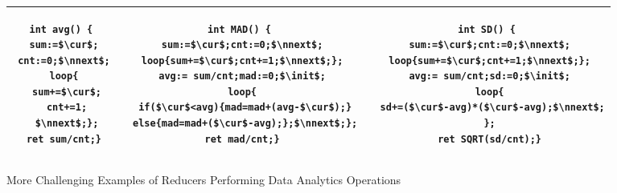 \vspace{-0.7cm}
\begin{figure}
	\centering
	\lstset{language=C,
		basicstyle=\ttfamily\scriptsize}
	\begin{tabular}{|c|c|c|}
		\hline
		\begin{minipage}[t]{0.2\textwidth}
		\vspace{-0.5cm}
			\begin{lstlisting}[mathescape=true]
int avg() {
 sum:=$\cur$;
 cnt:=0;$\nnext$;
 loop{
  sum+=$\cur$;
  cnt+=1;
  $\nnext$;};
 ret sum/cnt;}
			\end{lstlisting}
		\end{minipage}&
		\begin{minipage}[t]{0.4\textwidth}
		\vspace{-0.5cm}
\begin{lstlisting}[mathescape=true]
int MAD() {
 sum:=$\cur$;cnt:=0;$\nnext$;
 loop{sum+=$\cur$;cnt+=1;$\nnext$;};
 avg:= sum/cnt;mad:=0;$\init$;
 loop{
  if($\cur$<avg){mad=mad+(avg-$\cur$);}
  else{mad=mad+($\cur$-avg);};$\nnext$;};
 ret mad/cnt;}
\end{lstlisting}
		\end{minipage}&
		\begin{minipage}[t]{0.4\textwidth}
		\vspace{-0.5cm}
			\begin{lstlisting}[mathescape=true]
int SD() {
 sum:=$\cur$;cnt:=0;$\nnext$;
 loop{sum+=$\cur$;cnt+=1;$\nnext$;};
 avg:= sum/cnt;sd:=0;$\init$;
 loop{
  sd+=($\cur$-avg)*($\cur$-avg);$\nnext$;
 };
 ret SQRT(sd/cnt);}
			\end{lstlisting}
		\end{minipage}\\
		\hline		
	\end{tabular}
	\caption{More Challenging Examples of Reducers Performing Data Analytics Operations}
	\label{fig:examples2}
\vspace{-0.5cm}
\end{figure}
